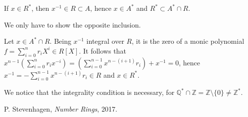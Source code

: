 \documentclass{article}
\newcommand{\numberset}{\mathbb}
\newcommand{\Z}{\numberset{Z}}
\newcommand{\Q}{\numberset{Q}}
\begin{document}
If $x\in R^*$, then $x^{-1}\in R\subset A$, hence $x\in A^*$ and $R^*\subset A^*\cap R$.

We only have to show the opposite inclusion.

Let $x\in A^*\cap R$. Being $x^{-1}$ integral over $R$, it is the zero of a monic polynomial $f=\sum_{i=0}^n r_iX^i\in R[X]$. It follows that $x^{n-1}(\sum_{i=0}^n r_ix^{-i})=(\sum_{i=0}^{n-1} x^{n-(i+1)}r_i)+x^{-1}=0$, hence $x^{-1}=-\sum_{i=0}^{n-1} x^{n-(i+1)}r_i\in R$ and $x\in R^*$.

We notice that the integrality condition is necessary, for $\Q^*\cap\Z=\Z\setminus\{0\}\neq\Z^*$.

\begin{thebibliography}{9}
		P. Stevenhagen,
		\textit{Number Rings},
		2017.
\end{thebibliography}
\end{document}
